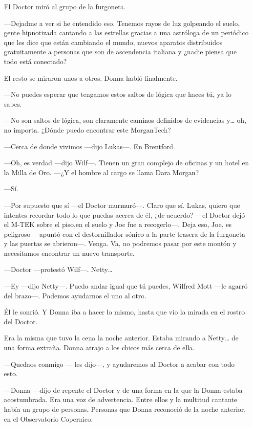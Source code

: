 El Doctor miró al grupo de la furgoneta.

---Dejadme a ver si he entendido eso. Tenemos rayos de luz golpeando el
suelo, gente hipnotizada cantando a las estrellas gracias a una
astróloga de un periódico que les dice que están cambiando el mundo,
nuevos aparatos distribuidos gratuitamente a personas que son de
ascendencia italiana y ¿nadie piensa que todo está conectado?

El resto se miraron unos a otros. Donna habló finalmente.

---No puedes esperar que tengamos estos saltos de lógica que haces tú,
ya lo sabes.

---No son saltos de lógica, son claramente caminos definidos de
evidencias y\ldots{} oh, no importa. ¿Dónde puedo encontrar este
MorganTech?

---Cerca de donde vivimos ---dijo Lukas---. En Brentford.

---Oh, es verdad ---dijo Wilf---. Tienen un gran complejo de oficinas y
un hotel en la Milla de Oro. ---¿Y el hombre al cargo se llama Dara
Morgan?

---Sí.

---Por supuesto que sí ---el Doctor murmuró---. Claro que sí. Lukas,
quiero que intentes recordar todo lo que puedas acerca de él, ¿de
acuerdo? ---el Doctor dejó el M-TEK sobre el piso,en el suelo y Joe fue
a recogerlo---. Deja eso, Joe, es peligroso ---apuntó con el
destornillador sónico a la parte trasera de la furgoneta y las puertas
se abrieron---. Venga. Va, no podremos pasar por este montón y
necesitamos encontrar un nuevo transporte.

---Doctor ---protestó Wilf---. Netty\ldots{}

---Ey ---dijo Netty---. Puedo andar igual que tú puedes, Wilfred Mott
---le agarró del brazo---. Podemos ayudarnos el uno al otro.

Él le sonrió. Y Donna iba a hacer lo mismo, hasta que vio la mirada en
el rostro del Doctor.

Era la misma que tuvo la cena la noche anterior. Estaba mirando a
Netty\ldots{} de una forma extraña. Donna atrajo a los chicos más cerca
de ella.

---Quedaos conmigo --- les dijo---, y ayudaremos al Doctor a acabar con
todo esto.

---Donna ---dijo de repente el Doctor y de una forma en la que la Donna
estaba acostumbrada. Era una voz de advertencia. Entre ellos y la
multitud cantante había un grupo de personas. Personas que Donna
reconoció de la noche anterior, en el Observatorio Copernico.

